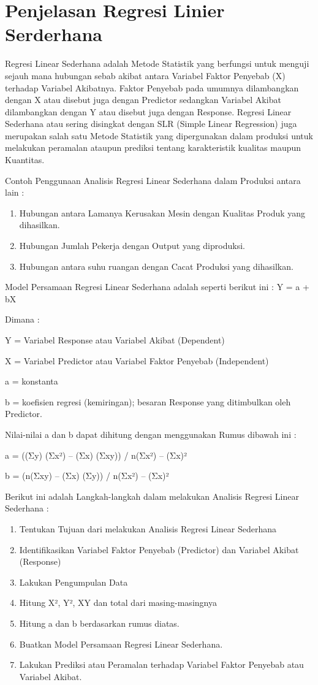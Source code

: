 \section{Penjelasan Regresi Linier Serderhana}
\par Regresi Linear Sederhana adalah Metode Statistik yang berfungsi untuk menguji sejauh mana hubungan sebab akibat antara Variabel Faktor Penyebab (X) terhadap Variabel Akibatnya. Faktor Penyebab pada umumnya dilambangkan dengan X atau disebut juga dengan Predictor sedangkan Variabel Akibat dilambangkan dengan Y atau disebut juga dengan Response. Regresi Linear Sederhana atau sering disingkat dengan SLR (Simple Linear Regression) juga merupakan salah satu Metode Statistik yang dipergunakan dalam produksi untuk melakukan peramalan ataupun prediksi tentang karakteristik kualitas maupun Kuantitas.
\par Contoh Penggunaan Analisis Regresi Linear Sederhana dalam Produksi antara lain :
\begin{enumerate}
    \item Hubungan antara Lamanya Kerusakan Mesin dengan Kualitas Produk yang dihasilkan.
    \item Hubungan Jumlah Pekerja dengan Output yang diproduksi.
    \item Hubungan antara suhu ruangan dengan Cacat Produksi yang dihasilkan.
\end{enumerate}
\par Model Persamaan Regresi Linear Sederhana adalah seperti berikut ini : Y = a + bX
\par Dimana :
\par Y = Variabel Response atau Variabel Akibat (Dependent)
\par X = Variabel Predictor atau Variabel Faktor Penyebab (Independent)
\par a = konstanta
\par b = koefisien regresi (kemiringan); besaran Response yang ditimbulkan oleh Predictor.
\par Nilai-nilai a dan b dapat dihitung dengan menggunakan Rumus dibawah ini :
\par a =   ((Σy) (Σx²) – (Σx) (Σxy)) / n(Σx²) – (Σx)²
\par b =   (n(Σxy) – (Σx) (Σy)) / n(Σx²) – (Σx)²
\par Berikut ini adalah Langkah-langkah dalam melakukan Analisis Regresi Linear Sederhana :
\begin{enumerate}
    \item Tentukan Tujuan dari melakukan Analisis Regresi Linear Sederhana 
    \item Identifikasikan Variabel Faktor Penyebab (Predictor) dan Variabel Akibat (Response)
    \item Lakukan Pengumpulan Data
    \item Hitung  X², Y², XY dan total dari masing-masingnya
    \item Hitung a dan b berdasarkan rumus diatas.
    \item Buatkan Model Persamaan Regresi Linear Sederhana.
    \item Lakukan Prediksi atau Peramalan terhadap Variabel Faktor Penyebab atau Variabel Akibat.
\end{enumerate}
